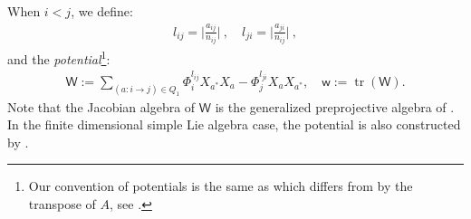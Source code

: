 \documentclass[10pt]{amsart}
\theoremstyle{definition}
\numberwithin{equation}{section}
\newcommand{\sW}{\mathsf{W}}
\newcommand{\sw}{\mathsf{w}}
\newcommand{\tr}{\operatorname{tr}}
\begin{document}
When $i<j$, we define: 
\begin{align*}
    l_{ij}=\bigg|\frac{a_{ij}}{n_{ij}}\bigg|\:, \quad l_{ji}=\bigg|\frac{a_{ji}}{n_{ij}}\bigg|\:,
    \end{align*}
and the \textit{potential}\footnote{Our convention of potentials is the same as \cite[Eqn.~(1)]{YZ} which differs from \cite{GLS} by the transpose of $A$, see \cite[Rmk.~4.2]{YZ}.}:
\begin{align*}
    \sW:=\sum_{(a:i\to j)\in Q_1}\Phi_i^{l_{ij}}X_{a^*}X_a-\Phi_j^{l_{ji}}X_aX_{a^*}, \quad \sw:=\tr(\sW).
\end{align*}
Note that the Jacobian algebra of $\sW$ is the generalized preprojective algebra of \cite{GLS}. 
In the finite dimensional simple Lie algebra case, the potential is also constructed by \cite{CD}.
\end{document}
